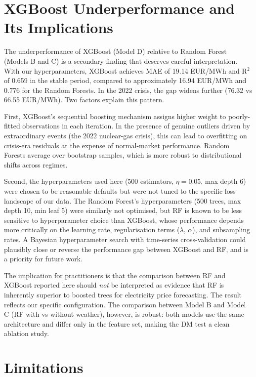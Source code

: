 \section{XGBoost Underperformance and Its Implications}

The underperformance of XGBoost (Model D) relative to Random Forest (Models B
and C) is a secondary finding that deserves careful interpretation. With our
hyperparameters, XGBoost achieves MAE of 19.14 EUR/MWh and R$^2$ of 0.659 in
the stable period, compared to approximately 16.94 EUR/MWh and 0.776 for the
Random Forests. In the 2022 crisis, the gap widens further (76.32 vs 66.55
EUR/MWh). Two factors explain this pattern.

First, XGBoost's sequential boosting mechanism assigns higher weight to
poorly-fitted observations in each iteration. In the presence of genuine
outliers driven by extraordinary events (the 2022 nuclear-gas crisis), this
can lead to overfitting on crisis-era residuals at the expense of
normal-market performance. Random Forests average over bootstrap samples,
which is more robust to distributional shifts across regimes.

Second, the hyperparameters used here (500 estimators, $\eta = 0.05$, max
depth 6) were chosen to be reasonable defaults but were not tuned to the
specific loss landscape of our data. The Random Forest's hyperparameters
(500 trees, max depth 10, min leaf 5) were similarly not optimised, but RF
is known to be less sensitive to hyperparameter choice than XGBoost, whose
performance depends more critically on the learning rate, regularisation
terms ($\lambda$, $\alpha$), and subsampling rates. A Bayesian hyperparameter
search with time-series cross-validation could plausibly close or reverse the
performance gap between XGBoost and RF, and is a priority for future work.

The implication for practitioners is that the comparison between RF and
XGBoost reported here should \textit{not} be interpreted as evidence that RF
is inherently superior to boosted trees for electricity price forecasting. The
result reflects our specific configuration. The comparison between Model B and
Model C (RF with vs without weather), however, is robust: both models use the
same architecture and differ only in the feature set, making the DM test a
clean ablation study.

\section{Limitations}
\label{sec:limitations}

